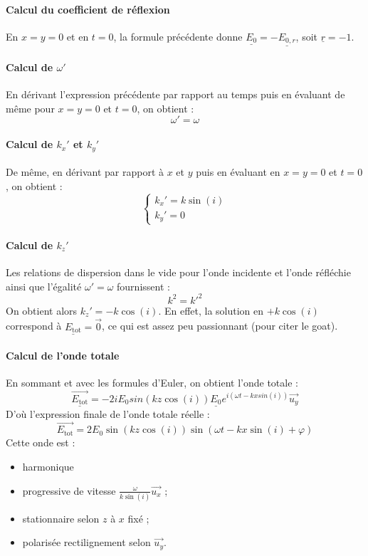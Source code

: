 \documentclass[french]{book}
\theoremstyle{plain}
\theoremstyle{definition}
\theoremstyle{remark}
\begin{document}
\paragraph{Calcul du coefficient de réflexion} En $x=y=0$ et en $t=0$, la formule précédente donne $\underline{E_0}=-\underline{E_{0,r}}$, soit $\underline{r}=-1$.
\paragraph{Calcul de $\omega'$} En dérivant l'expression précédente par rapport au temps puis en évaluant de même pour $x=y=0$ et $t=0$, on obtient : $$\omega'=\omega$$
\paragraph{Calcul de $k_x'$ et $k_y'$} De même, en dérivant par rapport à $x$ et $y$ puis en évaluant en $x=y=0$ et $t=0$, on obtient : $$\begin{cases}
	k_x'=k\sin(i)\\
	k_y'=0
\end{cases}$$
\paragraph{Calcul de $k_z'$} Les relations de dispersion dans le vide pour l'onde incidente et l'onde réfléchie ainsi que l'égalité $\omega'=\omega$ fournissent : $$k^2=k'^2$$ On obtient alors $k_z'=-k\cos(i)$. En effet, la solution en $+k\cos(i)$ correspond à $\underline{E_\text{tot}}=\overrightarrow{0}$, ce qui est assez peu passionnant (pour citer le goat).
\paragraph{Calcul de l'onde totale} En sommant et avec les formules d'Euler, on obtient l'onde totale : $$\underline{\overrightarrow{E_\text{tot}}}=-2iE_0sin(kz\cos(i))\underline{E_0}e^{i(\omega t-kxsin(i))}\overrightarrow{u_y}$$ D'où l'expression finale de l'onde totale réelle : $$\overrightarrow{E_\text{tot}}=2E_0\sin(kz\cos(i))\sin\left(\omega t-kx\sin(i)+\varphi\right)$$ Cette onde est :
\begin{itemize}
	\item harmonique
	\item progressive de vitesse $\displaystyle\frac{\omega}{k\sin(i)}\overrightarrow{u_x}$ ;
	\item stationnaire selon $z$ à $x$ fixé ;
	\item polarisée rectilignement selon $\overrightarrow{u_y}$.
\end{itemize}
\end{document}
